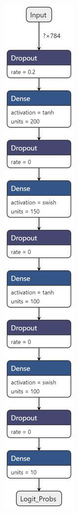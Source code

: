 \documentclass[11pt]{article}
\begin{document}
\begin{figure}[H]
\begin{subfigure}[c]{0.24\textwidth}
        \caption{}
        \label{fig:DNN5}
    \end{subfigure}
    \begin{subfigure}[c]{0.24\textwidth}
        \centering
        \includegraphics[height = 0.95\textheight]{normal6.png}

\end{subfigure}
\end{figure}
\end{document}
